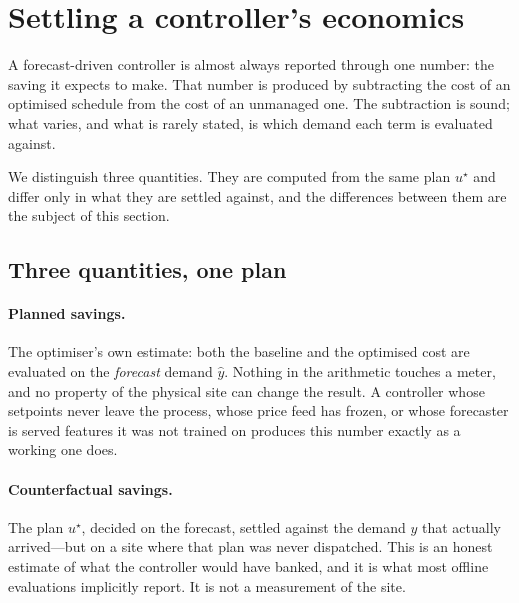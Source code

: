%
%

\section{Settling a controller's economics}
\label{sec:settle}

A forecast-driven controller is almost always reported through one number: the
saving it expects to make. That number is produced by subtracting the cost of
an optimised schedule from the cost of an unmanaged one. The subtraction is
sound; what varies, and what is rarely stated, is which demand each term is
evaluated against.

We distinguish three quantities. They are computed from the same plan
$u^{\star}$ and differ only in what they are settled against, and the
differences between them are the subject of this section.

\subsection{Three quantities, one plan}

\paragraph{Planned savings.} The optimiser's own estimate: both the baseline
and the optimised cost are evaluated on the \emph{forecast} demand
$\hat{y}$. Nothing in the arithmetic touches a meter, and no property of the
physical site can change the result. A controller whose setpoints never leave
the process, whose price feed has frozen, or whose forecaster is served
features it was not trained on produces this number exactly as a working one
does.

\paragraph{Counterfactual savings.} The plan $u^{\star}$, decided on the
forecast, settled against the demand $y$ that actually arrived---but on a site
where that plan was never dispatched. This is an honest estimate of what the
controller would have banked, and it is what most offline evaluations
implicitly report. It is not a measurement of the site.


